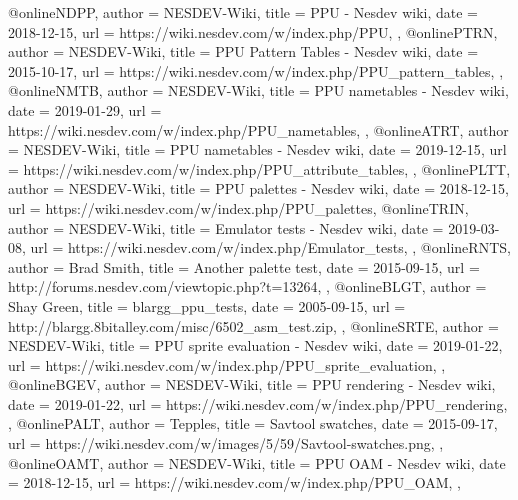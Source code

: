 @online{NDPP,
	author = {NESDEV-Wiki},
	title = {PPU - Nesdev wiki},
	date = {2018-12-15},
	url = {https://wiki.nesdev.com/w/index.php/PPU},
},
@online{PTRN,
	author = {NESDEV-Wiki},
	title = {PPU Pattern Tables - Nesdev wiki},
	date = {2015-10-17},
	url = {https://wiki.nesdev.com/w/index.php/PPU_pattern_tables},
},
@online{NMTB,
	author = {NESDEV-Wiki},
	title = {PPU nametables - Nesdev wiki},
	date = {2019-01-29},
	url = {https://wiki.nesdev.com/w/index.php/PPU_nametables},
},
@online{ATRT,
	author = {NESDEV-Wiki},
	title = {PPU nametables - Nesdev wiki},
	date = {2019-12-15},
	url = {https://wiki.nesdev.com/w/index.php/PPU_attribute_tables},
},
@online{PLTT,
	author = {NESDEV-Wiki},
	title = {PPU palettes - Nesdev wiki},
	date = {2018-12-15},
	url = {https://wiki.nesdev.com/w/index.php/PPU_palettes},
}
@online{TRIN,
	author = {NESDEV-Wiki},
	title = {Emulator tests - Nesdev wiki},
	date = {2019-03-08},
	url = {https://wiki.nesdev.com/w/index.php/Emulator_tests},
},
@online{RNTS,
	author = {Brad Smith},
	title = {Another palette test},
	date = {2015-09-15},
	url = {http://forums.nesdev.com/viewtopic.php?t=13264},
},
@online{BLGT,
	author = {Shay Green},
	title = {blargg\_ppu\_tests},
	date = {2005-09-15},
	url = {http://blargg.8bitalley.com/misc/6502_asm_test.zip},
},
@online{SRTE,
	author = {NESDEV-Wiki},
	title = {PPU sprite evaluation - Nesdev wiki},
	date = {2019-01-22},
	url = {https://wiki.nesdev.com/w/index.php/PPU_sprite_evaluation},
},
@online{BGEV,
	author = {NESDEV-Wiki},
	title = {PPU rendering - Nesdev wiki},
	date = {2019-01-22},
	url = {https://wiki.nesdev.com/w/index.php/PPU_rendering},
},
@online{PALT,
	author = {Tepples},
	title = {Savtool swatches},
	date = {2015-09-17},
	url = {https://wiki.nesdev.com/w/images/5/59/Savtool-swatches.png},
},
@online{OAMT,
	author = {NESDEV-Wiki},
	title = {PPU OAM - Nesdev wiki},
	date = {2018-12-15},
	url = {https://wiki.nesdev.com/w/index.php/PPU_OAM},
},


